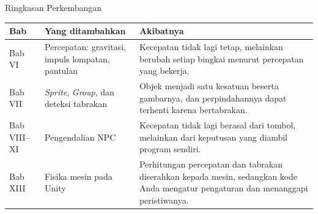 \documentclass[aspectratio=169,10pt]{beamer}
\begin{document}
\begin{frame}{Ringkasan Perkembangan}
{\scriptsize
\renewcommand{\arraystretch}{1.14}
\begin{tabularx}{\textwidth}{@{}>{\centering\arraybackslash}p{1.7cm}
    >{\raggedright\arraybackslash}p{5.0cm} X@{}}
\toprule
\textbf{Bab} & \textbf{Yang ditambahkan} & \textbf{Akibatnya} \\
\midrule
Bab VI & Percepatan: gravitasi, impuls lompatan, pantulan &
  Kecepatan tidak lagi tetap, melainkan berubah setiap bingkai menurut
  percepatan yang bekerja. \\
Bab VII & \emph{Sprite}, \emph{Group}, dan deteksi tabrakan &
  Objek menjadi satu kesatuan beserta gambarnya, dan perpindahannya dapat
  terhenti karena bertabrakan. \\
Bab VIII--XI & Pengendalian NPC &
  Kecepatan tidak lagi berasal dari tombol, melainkan dari keputusan yang
  diambil program sendiri. \\
Bab XIII & Fisika mesin pada Unity &
  Perhitungan percepatan dan tabrakan diserahkan kepada mesin, sedangkan kode
  Anda mengatur pengaturan dan menanggapi peristiwanya. \\
\bottomrule
\end{tabularx}}
\vspace{0.14cm}
\end{frame}
\end{document}
